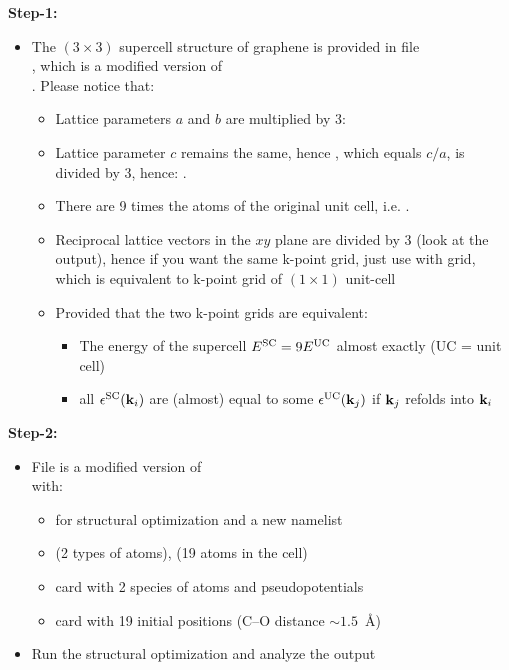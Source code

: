 \documentclass[landscape]{foils}
\begin{document}
{\bf Step-1:}
\vspace{-1em}
\begin{itemize}
\item The $(3\times3)$ supercell structure of
  graphene is provided in file\\
  , which is a modified version of\\
  . Please
  notice that:
  \begin{itemize}
  \item Lattice parameters $a$ and $b$ are multiplied by 3:
    \vspace{0.3em}
  \item Lattice parameter $c$ remains the same, hence ,
    which equals $c/a$, is divided by 3, hence: .
    \vspace{0.3em}
  \item There are 9 times the atoms of the original unit cell, i.e. .
    \vspace{0.3em}
  \item Reciprocal lattice vectors in the $xy$ plane are divided by 3
    (look at the output), hence if you want the same k-point grid,
    just use  with 
    grid, which is equivalent to  k-point grid of
    $(1\times1)$ unit-cell \vspace{0.3em}
  \item Provided that {\burgundy the two k-point grids are equivalent}:
    \begin{itemize}
    \item
      The energy of the supercell $E^{\rm SC} = 9E^{\rm UC}$ almost exactly
      (UC = unit cell)
    \item
      all $\epsilon^{\rm SC}({\bf k}_i)$ are (almost) equal to some
      $\epsilon^{\rm UC}({\bf k}_j)$ if ${\bf k}_j$ refolds into ${\bf k}_i$
    \end{itemize}   
  \end{itemize}
\end{itemize}

{\bf Step-2:}
\vspace{-1em}
\begin{itemize}
\item File  is a modified version of\\
   with:
  \begin{itemize}  
  \item {} for structural optimization and a new
    namelist 
  \item {} (2 types of atoms), 
    (19 atoms in the cell)
  \item {} card with 2 species of atoms and
    pseudopotentials
  \item {} card with 19 initial positions
    (C--O distance $\sim 1.5$~\AA)
  \end{itemize}
\item Run the structural optimization and analyze the output
\end{itemize}
\end{document}
